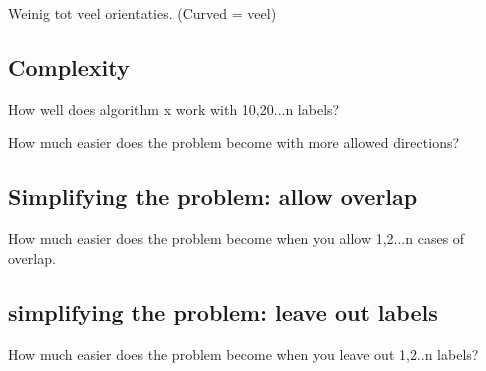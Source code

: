 \documentclass[a4paper]{article}
\begin{document}
Weinig tot veel orientaties. (Curved = veel)

\subsection{Complexity}
How well does algorithm x work with 10,20...n labels?

How much easier does the problem become with more allowed directions?

\subsection{Simplifying the problem: allow overlap}
How much easier does the problem become when you allow 1,2...n cases of overlap.

\subsection{simplifying the problem: leave out labels}
How much easier does the problem become when you leave out 1,2..n labels?

{}

\end{document}
